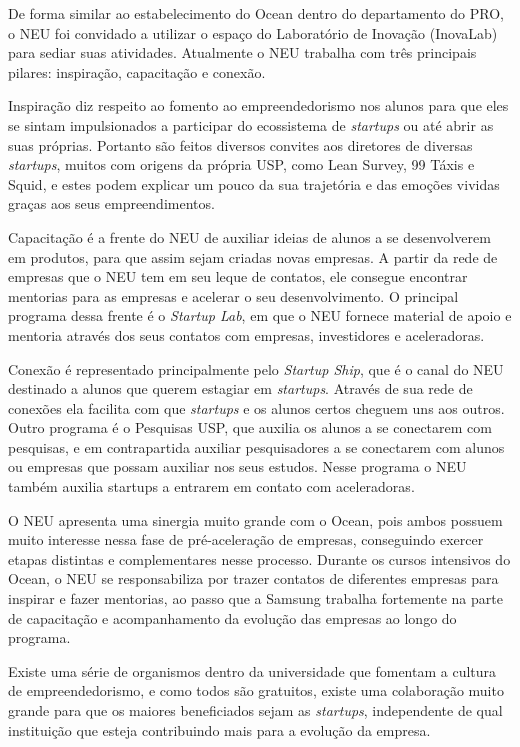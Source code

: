 De forma similar ao estabelecimento do Ocean dentro do departamento do PRO, o NEU foi convidado a utilizar o espaço do Laboratório de Inovação (InovaLab) para sediar suas atividades. Atualmente o NEU trabalha com três principais pilares: inspiração, capacitação e conexão.

Inspiração diz respeito ao fomento ao empreendedorismo nos alunos para que eles se sintam impulsionados a participar do ecossistema de \textit{startups} ou até abrir as suas próprias. Portanto são feitos diversos convites aos diretores de diversas \textit{startups}, muitos com origens da própria USP, como Lean Survey, 99 Táxis e Squid, e estes podem explicar um pouco da sua trajetória e das emoções vividas graças aos seus empreendimentos. 

Capacitação é a frente do NEU de auxiliar ideias de alunos a se desenvolverem em produtos, para que assim sejam criadas novas empresas. A partir da rede de empresas que o NEU tem em seu leque de contatos, ele consegue encontrar mentorias para as empresas e acelerar o seu desenvolvimento. O principal programa dessa frente é o \textit{Startup Lab}, em que o NEU fornece material de apoio e mentoria através dos seus contatos com empresas, investidores e aceleradoras.

Conexão é representado principalmente pelo \textit{Startup Ship}, que é o canal do NEU destinado a alunos que querem estagiar em \textit{startups}. Através de sua rede de conexões ela facilita com que \textit{startups} e os alunos certos cheguem uns aos outros. Outro programa é o Pesquisas USP, que auxilia os alunos a se conectarem com pesquisas, e em contrapartida auxiliar pesquisadores a se conectarem com alunos ou empresas que possam auxiliar nos seus estudos. Nesse programa o NEU também auxilia startups a entrarem em contato com aceleradoras.

O NEU apresenta uma sinergia muito grande com o Ocean, pois ambos possuem muito interesse nessa fase de pré-aceleração de empresas, conseguindo exercer etapas distintas e complementares nesse processo. Durante os cursos intensivos do Ocean, o NEU se responsabiliza por trazer contatos de diferentes empresas para inspirar e fazer mentorias, ao passo que a Samsung trabalha fortemente na parte de capacitação e acompanhamento da evolução das empresas ao longo do programa.

Existe uma série de organismos dentro da universidade que fomentam a cultura de empreendedorismo, e como todos são gratuitos, existe uma colaboração muito grande para que os maiores beneficiados sejam as \textit{startups}, independente de  qual instituição que esteja contribuindo mais para a evolução da empresa.

